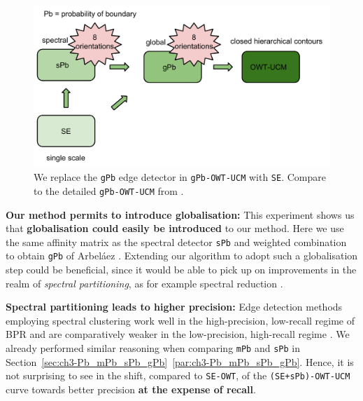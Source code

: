 \begin{figure}[t]
\centering
\includegraphics[width=1\textwidth]{images/experiments/SE_sPb-OWT-UCM/SE_sPb-OWT-UCM-details-SE_sPb_gPb.pdf}
\caption[{\tt (SE+sPb)-OWT-UCM} pipeline with focus on the edge-detection stage]{We replace the {\tt gPb} edge detector in {\tt gPb-OWT-UCM} with {\tt SE}. Compare to the detailed {\tt gPb-OWT-UCM} from .}
\label{fig:SE_sPb-OWT-UCM-details-SE_sPb_gPb}
\end{figure}



\textbf{Our method permits to introduce globalisation:} This experiment shows us that {\bf globalisation could easily be introduced} to our method. Here we use the same affinity matrix as the spectral detector {\tt sPb} and weighted combination to obtain {\tt gPb} of Arbel\'aez \etal \cite{Arbelaez11}. Extending our algorithm to adopt such a globalisation step could be beneficial, since it would be able to pick up on improvements in the realm of {\it spectral partitioning}, as for example spectral reduction \cite{Galasso14}. %

\textbf{Spectral partitioning leads to higher precision:} Edge detection methods employing spectral clustering %
work well in the high-precision, low-recall regime of BPR and are comparatively weaker in the low-precision, high-recall regime \cite{Fowlkes04,Yu2005segmentation}. We already performed similar reasoning when comparing {\tt mPb} and {\tt sPb} in Section~\ref*{sec:ch3-Pb_mPb_sPb_gPb}~\ref{par:ch3-Pb_mPb_sPb_gPb}. 
Hence, it is not surprising to see in  the shift, compared to {\tt SE-OWT}, of the {\tt (SE+sPb)-OWT-UCM} curve towards better precision {\bf at the expense of recall}.

